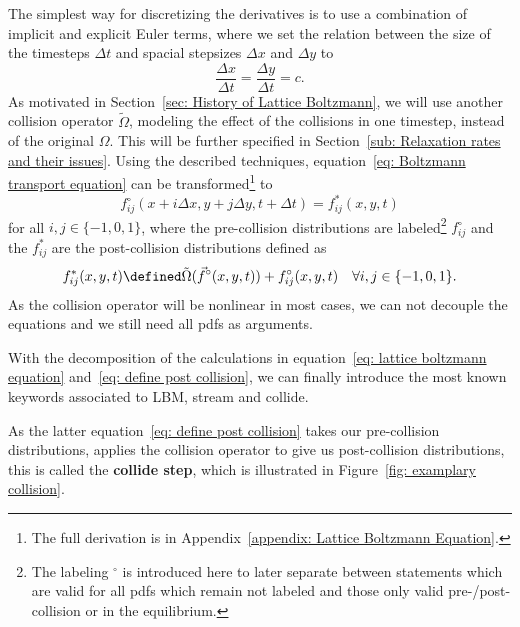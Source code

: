 The simplest way for discretizing the derivatives is to use a combination of implicit and explicit Euler terms, where we set the relation between the size of the timesteps $\Delta t$ and spacial stepsizes $\Delta x$ and $\Delta y$ to
\begin{equation}
  \label{eq: relation between stepsizes}
  \frac{\Delta x} {\Delta{t}} = \frac{\Delta y} {\Delta{t}} = c.
\end{equation}
As motivated in Section~\ref{sec: History of Lattice Boltzmann}, we will use another collision operator $\tilde{\Omega}$, modeling the effect of the collisions in one timestep, instead of the original $\Omega$.
This will be further specified in Section~\ref{sub: Relaxation rates and their issues}.
Using the described techniques, equation~\eqref{eq: Boltzmann transport equation} can be transformed\footnote{The full derivation is in Appendix~\ref{appendix: Lattice Boltzmann Equation}.} to
\begin{equation}
  \label{eq: lattice boltzmann equation}
    f_{ij}^\circ(x + i \Delta x , y + j \Delta y,t + \Delta t)
    = f_{ij}^*(x, y, t)
\end{equation}
for all $i,j\in \{-1, 0, 1\}$, where the  pre-collision distributions are labeled\footnote{The labeling $^\circ$ is introduced here to later separate between statements which are valid for all \glspl{pdf} which remain not labeled and those only valid pre-/post-collision or in the equilibrium.} $f_{ij}^\circ$ and the $f_{ij}^*$ are the post-collision distributions defined as
\begin{equation}
  \label{eq: define post collision}
  f_{ij}^*(x, y, t) \defined \tilde{\Omega}(\vec{f}^\circ(x,y,t)) + f_{ij}^\circ(x,y,t) \quad\forall i,j\in \{-1, 0, 1\}.
\end{equation}
As the collision operator will be nonlinear in most cases, we can not decouple the equations and we still need all \glspl{pdf} as arguments.

With the decomposition of the calculations in equation~\eqref{eq: lattice boltzmann equation} and~\eqref{eq: define post collision}, we can finally introduce the most known keywords associated to LBM, stream and collide.

As the latter equation~\eqref{eq: define post collision} takes our pre-collision distributions, applies the collision operator to give us post-collision distributions, this is called the \textbf{collide step}, which is illustrated in Figure~\ref{fig: examplary collision}.

